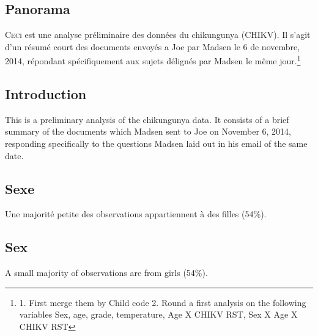 \documentclass[11pt]{article}
\begin{document}
\begin{multicols}{2} 

\subsection*{Panorama}

\lettrine[nindent=0em,lines=3]{C}{eci} est une analyse préliminaire des données du chikungunya (CHIKV).  Il s'agit d'un résumé court des documents envoyés a Joe par Madsen le 6 de novembre, 2014, répondant spécifiquement aux sujets délignés par Madsen le même jour.\footnote{1. First merge them by Child code 2. Round a first analysis on the following variables Sex, age, grade, temperature, Age X CHIKV RST, Sex X Age X CHIKV RST}

\vfill
\columnbreak
\subsection*{Introduction}


This is a preliminary analysis of the chikungunya data.  It consists of a brief summary of the documents which Madsen sent to Joe on November 6, 2014, responding specifically to the questions Madsen laid out in his email of the same date.  

\end{multicols}
\begin{multicols}{2} 


\subsection*{Sexe}
Une majorité petite des observations appartiennent à des filles (54\%).

\vfill
\columnbreak

\subsection*{Sex}
A small majority of observations are from girls (54\%).

\end{multicols}
\end{document}
